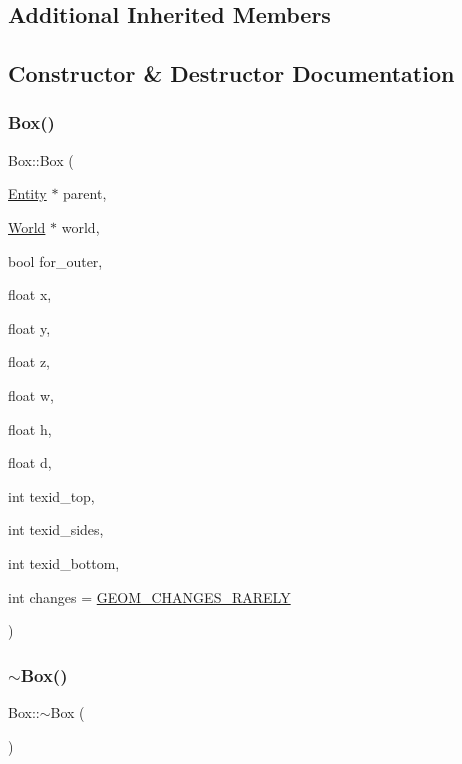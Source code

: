 \subsection*{Additional Inherited Members}


\subsection{Constructor \& Destructor Documentation}
\mbox{\label{classBox_aca29db382f87c7af916cc9114809ef05}} 
\subsubsection{\texorpdfstring{Box()}{Box()}}
{\footnotesize\ttfamily Box\+::\+Box (\begin{DoxyParamCaption}\item[{\mbox{\hyperlink{classEntity}{Entity}} $\ast$}]{parent,  }\item[{\mbox{\hyperlink{classWorld}{World}} $\ast$}]{world,  }\item[{bool}]{for\+\_\+outer,  }\item[{float}]{x,  }\item[{float}]{y,  }\item[{float}]{z,  }\item[{float}]{w,  }\item[{float}]{h,  }\item[{float}]{d,  }\item[{int}]{texid\+\_\+top,  }\item[{int}]{texid\+\_\+sides,  }\item[{int}]{texid\+\_\+bottom,  }\item[{int}]{changes = {\ttfamily \mbox{\hyperlink{World_8h_adf764cbdea00d65edcd07bb9953ad2b7afd62cb9ff74dd66a2597e9c31e205cba}{G\+E\+O\+M\+\_\+\+C\+H\+A\+N\+G\+E\+S\+\_\+\+R\+A\+R\+E\+LY}}} }\end{DoxyParamCaption})}

\mbox{\label{classBox_a6a5e09398e85d602a046b429062fb9c2}} 
\subsubsection{\texorpdfstring{$\sim$\+Box()}{~Box()}}
{\footnotesize\ttfamily Box\+::$\sim$\+Box (\begin{DoxyParamCaption}{ }\end{DoxyParamCaption})}



